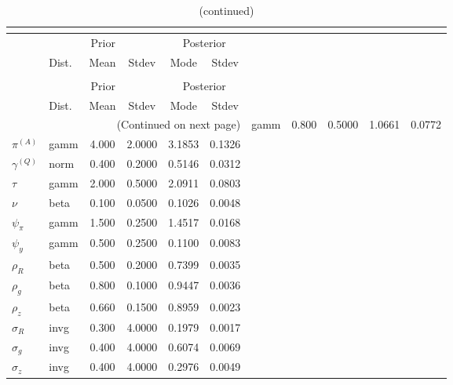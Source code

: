  
\begin{center}
\begin{longtable}{llcccc} 
\caption{Results from posterior maximization (parameters)}\\
 \label{Table:Posterior:1}\\
\toprule 
  & \multicolumn{3}{c}{Prior}  &  \multicolumn{2}{c}{Posterior} \\
  \cmidrule(r{.75em}){2-4} \cmidrule(r{.75em}){5-6}
  & Dist. & Mean  & Stdev & Mode & Stdev \\ 
\midrule \endfirsthead 
\caption{(continued)}\\
 \bottomrule 
  & \multicolumn{3}{c}{Prior}  &  \multicolumn{2}{c}{Posterior} \\
  \cmidrule(r{.75em}){2-4} \cmidrule(r{.75em}){5-6}
  & Dist. & Mean  & Stdev & Mode & Stdev \\ 
\midrule \endhead 
\bottomrule \multicolumn{6}{r}{(Continued on next page)}\endfoot 
\bottomrule\endlastfoot 
${r_{A}}$ & gamm &   0.800 & 0.5000 &   1.0661 &  0.0772 \\ 
${\pi^{(A)}}$ & gamm &   4.000 & 2.0000 &   3.1853 &  0.1326 \\ 
${\gamma^{(Q)}}$ & norm &   0.400 & 0.2000 &   0.5146 &  0.0312 \\ 
${\tau}$ & gamm &   2.000 & 0.5000 &   2.0911 &  0.0803 \\ 
${\nu}$ & beta &   0.100 & 0.0500 &   0.1026 &  0.0048 \\ 
${\psi_\pi}$ & gamm &   1.500 & 0.2500 &   1.4517 &  0.0168 \\ 
${\psi_y}$ & gamm &   0.500 & 0.2500 &   0.1100 &  0.0083 \\ 
${\rho_R}$ & beta &   0.500 & 0.2000 &   0.7399 &  0.0035 \\ 
${\rho_{g}}$ & beta &   0.800 & 0.1000 &   0.9447 &  0.0036 \\ 
${\rho_z}$ & beta &   0.660 & 0.1500 &   0.8959 &  0.0023 \\ 
${\sigma_R}$ & invg &   0.300 & 4.0000 &   0.1979 &  0.0017 \\ 
${\sigma_{g}}$ & invg &   0.400 & 4.0000 &   0.6074 &  0.0069 \\ 
${\sigma_z}$ & invg &   0.400 & 4.0000 &   0.2976 &  0.0049 \\ 
\end{longtable}
 \end{center}
